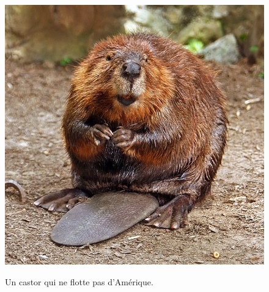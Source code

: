 \begin{figure}[h!]
\begin{center}
\includegraphics[angle = 45., width = .3\textwidth]{introduction/figures/castor.jpg}
\label{fig:castornonflotant}
\end{center}
\caption{Un castor qui ne flotte pas d’Amérique.}
\label{fig:groscastor}
\end{figure}

\blindtext[10]